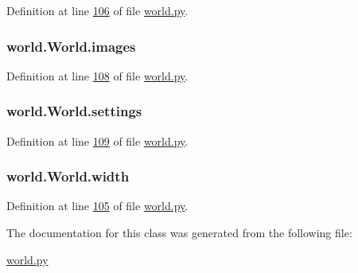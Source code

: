 Definition at line \hyperlink{world_8py_source_l00106}{106} of file \hyperlink{world_8py_source}{world.\+py}.

\hypertarget{classworld_1_1World_a9388f4c8146cbf9983f4a42c3015b61a}{
\subsubsection[{images}]{\setlength{\rightskip}{0pt plus 5cm}world.\+World.\+images}}\label{classworld_1_1World_a9388f4c8146cbf9983f4a42c3015b61a}


Definition at line \hyperlink{world_8py_source_l00108}{108} of file \hyperlink{world_8py_source}{world.\+py}.

\hypertarget{classworld_1_1World_a41e0f9d00bb365408abee5a084bdce24}{
\subsubsection[{settings}]{\setlength{\rightskip}{0pt plus 5cm}world.\+World.\+settings}}\label{classworld_1_1World_a41e0f9d00bb365408abee5a084bdce24}


Definition at line \hyperlink{world_8py_source_l00109}{109} of file \hyperlink{world_8py_source}{world.\+py}.

\hypertarget{classworld_1_1World_a5ace9de2d4cd40bbb013db9712f4ef34}{
\subsubsection[{width}]{\setlength{\rightskip}{0pt plus 5cm}world.\+World.\+width}}\label{classworld_1_1World_a5ace9de2d4cd40bbb013db9712f4ef34}


Definition at line \hyperlink{world_8py_source_l00105}{105} of file \hyperlink{world_8py_source}{world.\+py}.



The documentation for this class was generated from the following file\+:\begin{DoxyCompactItemize}
\item 
\hyperlink{world_8py}{world.\+py}\end{DoxyCompactItemize}
